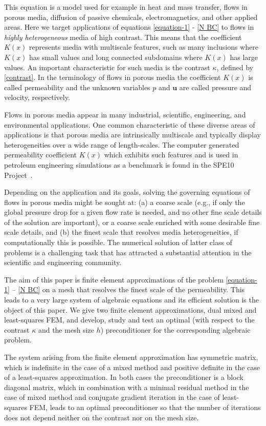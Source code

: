 \documentclass[11pt]{amsart}
\numberwithin{equation}{section}
\theoremstyle{definition}\newtheorem{example}{Example}[section]
\begin{document}
This equation is a model used for example in heat and mass
transfer,  flows in porous media, diffusion of passive chemicals, 
electromagnetics,  and other applied areas. 
Here we target applications of equations \eqref{equation-1} - \eqref{N
  BC} to flows in {\it highly heterogeneous} media of high contrast. 
This means that the coefficient $K(x)$ represents media with
multiscale features, such as many inclusions where $K(x)$ has small
values and long connected subdomains where $K(x)$ has large values. An
important characteristic for such media is the contrast $\kappa$,
defined by \eqref{contrast}. In the terminology of flows in porous
media the coefficient $K(x)$ is called permeability and the unknown 
variables $p$ and ${{\mathbf u}}$ are called pressure and 
velocity, respectively.

Flows in porous media appear in many industrial, scientific, engineering, and 
environmental applications. One common characteristic of these diverse areas 
of applications is that porous media are intrinsically multiscale and 
typically display heterogeneities over a wide range of length-scales.
The computer generated permeability coefficient $K(x)$ which exhibits such
features and is used in petroleum engineering simulations as a
benchmark is found in the SPE10 Project~\cite{SPE10_project}.

Depending on the application and its goals, solving the governing equations of flows in porous media might be sought at: 
(a) a coarse scale (e.g., if only the global pressure drop for a given 
flow rate is needed, and no other fine 
scale details of the solution are important), 
or  a coarse scale enriched with some desirable fine scale details, and 
(b) the finest scale  that resolves media heterogeneities, if computationally 
this is possible. 
The numerical solution of latter class of problems is a challenging task that has attracted a 
substantial attention in the scientific and engineering community.

The aim of this paper is finite element approximations of the problem 
\eqref{equation-1} -- \eqref{N BC} on a mesh that resolves the finest scale of
the permeability. This leads to a very large system of algebraic equations 
and its efficient solution is the object of this paper.  We give two finite element
approximations, dual mixed and least-squares FEM, and  develop, study 
and test an optimal (with respect to the contrast ${\kappa}$ and the mesh
size $h$)  preconditioner for the corresponding algebraic problem.

The system arising from the finite element approximation
has symmetric matrix, which is indefinite in the case of a mixed method
and positive definite in the case of a least-squares approximation. In
both cases the preconditioner is a block diagonal matrix, which in
combination with a minimal residual method in the case of mixed method
and conjugate gradient iteration in the case of least-squares FEM,
leads to an optimal preconditioner so that the number of iterations
does not depend neither on the contrast nor on the mesh size.
\end{document}
